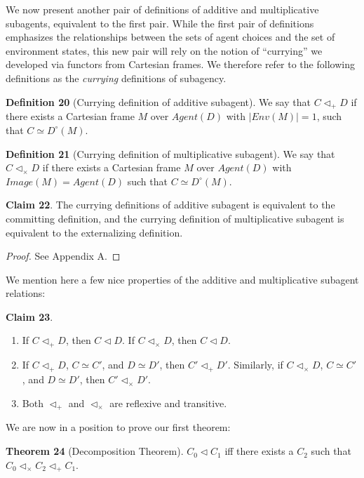 \documentclass{article}
\begin{document}
\bigskip
\noindent We now present another pair of definitions of additive and multiplicative subagents, equivalent to the first pair.
While the first pair of definitions emphasizes the relationships between the sets of agent choices and the set of environment states, this new pair will rely on the notion of ``currying'' we developed via functors from Cartesian frames.
We therefore refer to the following definitions as the \emph{currying} definitions of subagency.

\bigskip
\noindent \textbf{Definition 20} (Currying definition of additive subagent).
We say that $C \triangleleft_{+} D$ if there exists a Cartesian frame $M$ over $Agent(D)$ with $|Env(M)| = 1$, such that $C \simeq D^{\circ}(M)$.

\bigskip
\noindent \textbf{Definition 21} (Currying definition of multiplicative subagent).
We say that $C \triangleleft_{\times} D$ if there exists a Cartesian frame $M$ over $Agent(D)$ with $Image(M) = Agent(D)$ such that $C \simeq D^{\circ}(M)$. 

\bigskip
\noindent \textbf{Claim 22}. \label{claim:subcurrycommequiv}
The currying definitions of additive subagent is equivalent to the committing definition, and the currying definition of multiplicative subagent is equivalent to the externalizing definition.

\begin{proof}
See Appendix A.
\end{proof}

\noindent We mention here a few nice properties of the additive and multiplicative subagent relations:

\bigskip
\noindent \textbf{Claim 23}.
\begin{enumerate}
    \item If $C \triangleleft_{+} D$, then $C \triangleleft D$. If $C \triangleleft_{\times} D$, then $C \triangleleft D$.
    \item If $C \triangleleft_{+} D$, $C \simeq C'$, and $D \simeq D'$, then $C' \triangleleft_{+} D'$. Similarly, if $C \triangleleft_{\times} D$, $C \simeq C'$, and $D \simeq D'$, then $C' \triangleleft_{\times} D'$.
    \item Both $\triangleleft_{+}$ and $\triangleleft_{\times}$ are reflexive and transitive.
\end{enumerate}

\noindent We are now in a position to prove our first theorem:

\bigskip
\noindent \textbf{Theorem 24} (Decomposition Theorem).
$C_0 \triangleleft C_1$ iff there exists a $C_2$ such that $C_0 \triangleleft_{\times} C_2 \triangleleft_{+} C_1$.
\end{document}

